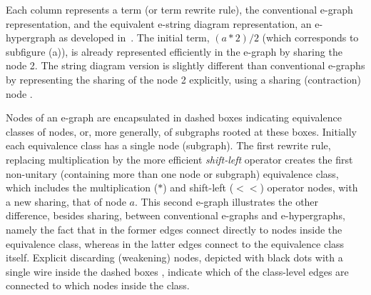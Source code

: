 \documentclass[peerreviewcls]{IEEEtran}
\begin{document}
Each column represents a term (or term rewrite rule), the conventional e-graph representation, and the equivalent e-string diagram representation, an e-hypergraph as developed in~\cite{ghica2024equivalencehypergraphsegraphsmonoidal}. 
The initial term, $(a*2)/2$ (which corresponds to subfigure (a)), is already represented efficiently in the e-graph by sharing the node 2.
The string diagram version is slightly different than conventional e-graphs by representing the sharing of the node 2 explicitly, using a sharing (contraction) node
. 

Nodes of an e-graph are encapsulated in dashed boxes indicating equivalence classes of nodes, or, more generally, of subgraphs rooted at these boxes.
Initially each equivalence class has a single node (subgraph).
The first rewrite rule, replacing multiplication by the more efficient \emph{shift-left} operator creates the first non-unitary (containing more than one node or subgraph) equivalence class, which includes the multiplication ($*$) and shift-left ($<\!\!<$) operator nodes, with a new sharing, that of node $a$.
This second e-graph illustrates the other difference, besides sharing, between conventional e-graphs and e-hypergraphs, namely the fact that in the former edges connect directly to nodes inside the equivalence class, whereas in the latter edges connect to the equivalence class itself.
Explicit discarding (weakening) nodes, depicted with black dots with a single wire inside the dashed boxes 
, indicate which of the class-level edges are connected to which nodes inside the class.
\end{document}
